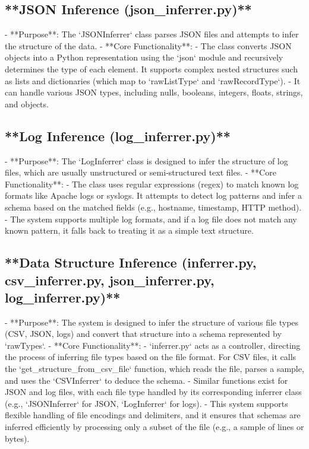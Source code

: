 \documentclass[sigconf,natbib=false]{acmart}
\begin{document}
\begin{draft}
\subsection{**JSON Inference (json_inferrer.py)**}
   - **Purpose**: The `JSONInferrer` class parses JSON files and attempts to infer the structure of the data.
   - **Core Functionality**:
     - The class converts JSON objects into a Python representation using the `json` module and recursively determines the type of each element. It supports complex nested structures such as lists and dictionaries (which map to `rawListType` and `rawRecordType`).
     - It can handle various JSON types, including nulls, booleans, integers, floats, strings, and objects.

\subsection{**Log Inference (log_inferrer.py)**}
   - **Purpose**: The `LogInferrer` class is designed to infer the structure of log files, which are usually unstructured or semi-structured text files.
   - **Core Functionality**:
     - The class uses regular expressions (regex) to match known log formats like Apache logs or syslogs. It attempts to detect log patterns and infer a schema based on the matched fields (e.g., hostname, timestamp, HTTP method).
     - The system supports multiple log formats, and if a log file does not match any known pattern, it falls back to treating it as a simple text structure.

\subsection{ **Data Structure Inference (inferrer.py, csv_inferrer.py, json_inferrer.py, log_inferrer.py)**}
   - **Purpose**: The system is designed to infer the structure of various file types (CSV, JSON, logs) and convert that structure into a schema represented by `rawTypes`.
   - **Core Functionality**:
     - `inferrer.py` acts as a controller, directing the process of inferring file types based on the file format. For CSV files, it calls the `get_structure_from_csv_file` function, which reads the file, parses a sample, and uses the `CSVInferrer` to deduce the schema.
     - Similar functions exist for JSON and log files, with each file type handled by its corresponding inferrer class (e.g., `JSONInferrer` for JSON, `LogInferrer` for logs).
     - This system supports flexible handling of file encodings and delimiters, and it ensures that schemas are inferred efficiently by processing only a subset of the file (e.g., a sample of lines or bytes).


\end{draft}
\end{document}
